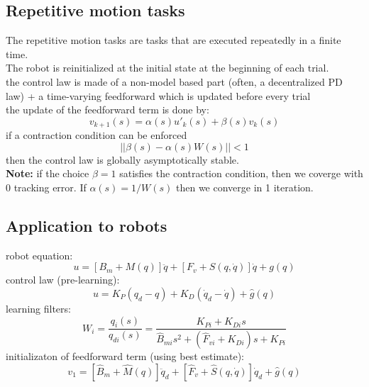 \documentclass[a4paper,12pt]{article}
\begin{document}
\subsection{Repetitive motion tasks}
The repetitive motion tasks are tasks that are executed
repeatedly in a finite time.\\
The robot is reinitialized at the initial state at the beginning
of each trial.\\
the control law is made of a non-model based part (often, a
decentralized PD law) + a time-varying feedforward which is
updated before every trial\\
 the update of the feedforward term is done by:
\begin{equation}
    v_{k+1}(s) = \alpha (s) u'_k(s) + \beta (s) v_k(s)
\end{equation}
if a contraction condition can be enforced 
\begin{equation}
    ||\beta(s)-\alpha(s)W(s)|| < 1
\end{equation}
then the control law is globally asymptotically stable.\\
\textbf{Note:} if the choice $\beta = 1$ satisfies the contraction
condition, then we coverge with 0 tracking error. If $\alpha(s)=1/W(s)$
then we converge in 1 iteration.
\subsection{Application to robots}
robot equation:
\begin{equation}
    u = [B_m+M(q)]\ddot{q} + [F_v+S(q,\dot{q})]\dot{q} + g(q)
\end{equation}
control law (pre-learning):
\begin{equation}
    u = K_P(q_d-q) + K_D(\dot{q}_d-\dot{q}) + \hat{g}(q)
\end{equation}
learning filters:
\begin{equation}
    W_i=\frac{q_i(s)}{q_{di}(s)}=\frac{K_{Pi}+K_{Di}s}{\hat{B}_{mi}s^2+(\hat{F}_{vi}+K_{Di})s+K_{Pi}}
\end{equation}
initializaton of feedforward term (using best estimate):
\begin{equation}
    v_1=[\hat{B}_m+\hat{M}(q)]\ddot{q}_d + [\hat{F}_v+\hat{S}(q,\dot{q})]\dot{q}_d + \hat{g}(q)
\end{equation}
\end{document}
